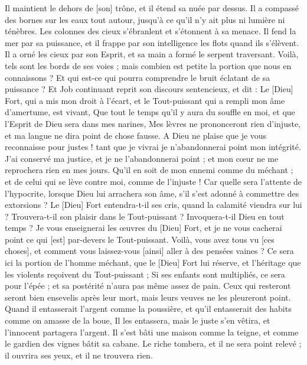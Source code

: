 \begin{multicols}{2}
Il maintient le dehors de [son] trône, et il étend sa nuée par dessus.
Il a compassé des bornes sur les eaux tout autour, jusqu'à ce qu'il n'y ait plus ni lumière ni ténèbres.
Les colonnes des cieux s'ébranlent et s'étonnent à sa menace.
Il fend la mer par sa puissance, et il frappe par son intelligence les flots quand ils s'élèvent.
Il a orné les cieux par son Esprit, et sa main a formé le serpent traversant.
Voilà, tels sont les bords de ses voies ; mais combien est petite la portion que nous en connaissons ? Et qui est-ce qui pourra comprendre le bruit éclatant de sa puissance ?
\VerseOne{}Et Job continuant reprit son discours sentencieux, et dit :
Le [Dieu] Fort, qui a mis mon droit à l'écart, et le Tout-puissant qui a rempli mon âme d'amertume, est vivant,
Que tout le temps qu'il y aura du souffle en moi, et que l'Esprit de Dieu sera dans mes narines,
Mes lèvres ne prononceront rien d'injuste, et ma langue ne dira point de chose fausse.
A Dieu ne plaise que je vous reconnaisse pour justes ! tant que je vivrai je n'abandonnerai point mon intégrité.
J'ai conservé ma justice, et je ne l'abandonnerai point ; et mon cœur ne me reprochera rien en mes jours.
Qu'il en soit de mon ennemi comme du méchant ; et de celui qui se lève contre moi, comme de l'injuste !
Car quelle sera l'attente de l'hypocrite, lorsque Dieu lui arrachera son âme, s'il s'est adonné à commettre des extorsions ?
Le [Dieu] Fort entendra-t-il ses cris, quand la calamité viendra sur lui ?
Trouvera-t-il son plaisir dans le Tout-puissant ? Invoquera-t-il Dieu en tout temps ?
Je vous enseignerai les œuvres du [Dieu] Fort, et je ne vous cacherai point ce qui [est] par-devers le Tout-puissant.
Voilà, vous avez tous vu [ces choses], et comment vous laissez-vous [ainsi] aller à des pensées vaines ?
Ce sera ici la portion de l'homme méchant, que le [Dieu] Fort lui réserve, et l'héritage que les violents reçoivent du Tout-puissant ;
Si ses enfants sont multipliés, ce sera pour l'épée ; et sa postérité n'aura pas même assez de pain.
Ceux qui resteront seront bien ensevelis après leur mort, mais leurs veuves ne les pleureront point.
Quand il entasserait l'argent comme la poussière, et qu'il entasserait des habits comme on amasse de la boue,
Il les entassera, mais le juste s'en vêtira, et l'innocent partagera l'argent.
Il s'est bâti une maison comme la teigne, et comme le gardien des vignes bâtit sa cabane.
Le riche tombera, et il ne sera point relevé ; il ouvrira ses yeux, et il ne trouvera rien.

\end{multicols}
